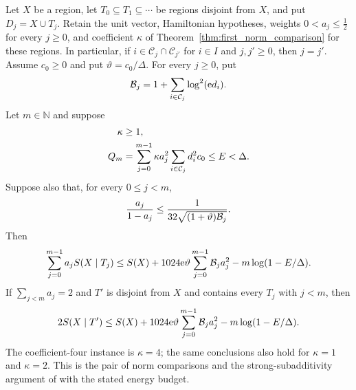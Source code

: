 \begin{theorem}
    \label{thm:buffer_discount}
    \leanok
    Let $X$ be a region, let $T_0\subseteq T_1\subseteq\cdots$ be regions
    disjoint from $X$, and put $D_j=X\cup T_j$.
    Retain the unit vector, Hamiltonian hypotheses, weights
    $0<a_j\le\tfrac12$ for every $j\ge0$, and coefficient $\kappa$ of
    Theorem~\ref{thm:first_norm_comparison} for these regions. In particular,
    if $i\in\mathcal C_j\cap\mathcal C_{j'}$ for $i\in I$ and
    $j,j'\ge0$, then $j=j'$. Assume $c_0\ge0$ and put $\vartheta=c_0/\Delta$.
    For every $j\ge0$, put
    \begin{align}
        \mathcal B_j=1+\sum_{i\in\mathcal C_j}\log^2(\mathrm e d_i).
        \notag
    \end{align}
    Let $m\in\mathbb N$ and suppose
    \begin{align}
        \kappa & \ge1,\notag                   \\
        Q_m    & =\sum_{j=0}^{m-1}\kappa a_j^2
        \sum_{i\in\mathcal C_j}d_i^2c_0\le E<\Delta.\notag
    \end{align}
    Suppose also that, for every $0\le j<m$,
    \begin{align}
        \frac{a_j}{1-a_j}
        \le\frac{1}{32\sqrt{(1+\vartheta)\mathcal B_j}}.\notag
    \end{align}
    Then
    \begin{align}
        \sum_{j=0}^{m-1}a_jS(X\mid T_j)
        \le S(X)+1024\mathrm e\vartheta
        \sum_{j=0}^{m-1}\mathcal B_j a_j^2
        -m\log(1-E/\Delta).\notag
    \end{align}
    If $\sum_{j<m}a_j=2$ and $T'$ is disjoint from $X$ and contains
    every $T_j$ with $j<m$, then
    \begin{align}
        2S(X\mid T')\le S(X)+1024\mathrm e\vartheta
        \sum_{j=0}^{m-1}\mathcal B_j a_j^2
        -m\log(1-E/\Delta).\notag
    \end{align}
    The coefficient-four instance is $\kappa=4$; the same conclusions
    also hold for $\kappa=1$ and $\kappa=2$.
    This is the pair of norm comparisons and the strong-subadditivity
    argument of \cite[Lemma~3.2]{OpenAI2026AreaLaw} with the stated energy
    budget.
\end{theorem}
